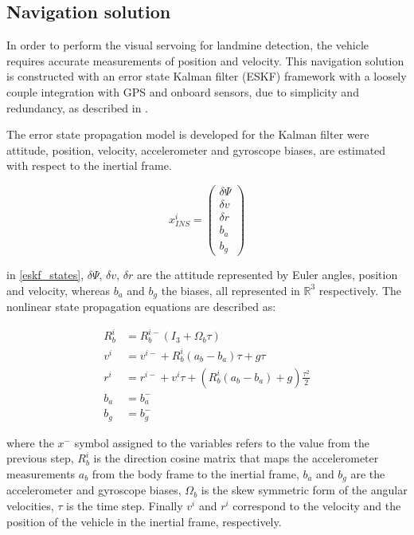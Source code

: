 \documentclass[conference]{IEEEtran}
\begin{document}
\subsection{Navigation solution}
In order to perform the visual servoing for landmine detection, the vehicle requires accurate measurements of position and velocity. This navigation solution is constructed with an error state Kalman filter (ESKF) framework with a loosely couple integration with GPS and onboard sensors, due to simplicity and redundancy, as described in \cite{Groves2015}. 


The error state propagation model is developed for the Kalman filter were attitude, position, velocity, accelerometer and gyroscope biases, are estimated with respect to the inertial frame.

\begin{equation}
x^{i}_{INS} = \left( \begin{matrix} \delta\Psi \\ \delta v  \\ \delta r \\ b_{a} \\ b_{g} \end{matrix} \right) \label{eskf_states}
\end{equation}

\noindent in \eqref{eskf_states}, $\delta\Psi$, $\delta v$, $\delta r$ are the attitude represented by Euler angles, position and velocity, whereas $b_{a}$ and $b_{g}$ the biases, all represented in $\mathbb{R}^{3}$ respectively. The nonlinear state propagation equations are described as:

\begin{align}
R^{i}_{b} &= R^{i-}_{b} (I_{3} + \Omega_{b}\tau) \\
v^{i}     &= v^{i-} + R^{i}_{b}(a_{b}-b_{a})\tau + g\tau \\
r^{i}     &= r^{i-} + v^{i}\tau + (R^{i}_{b}(a_{b}-b_{a}) + g) \frac{\tau^{2}}{2} \\
b_{a}     &= b^{-}_{a}\\
b_{g}     &= b^{-}_{g}
\end{align}

\noindent where the $x^{-}$ symbol assigned to the variables refers to the value from the previous step, $R^{i}_{b}$ is the direction cosine matrix that maps the accelerometer measurements $a_{b}$ from the body frame to the inertial frame, $b_{a}$ and $b_{g}$ are the accelerometer and gyroscope biases, $\Omega_{b}$ is the skew symmetric form of the angular velocities, $\tau$ is the time step. Finally $v^{i}$ and $r^{i}$ correspond to the velocity and the position of the vehicle in the inertial frame, respectively.
\end{document}
